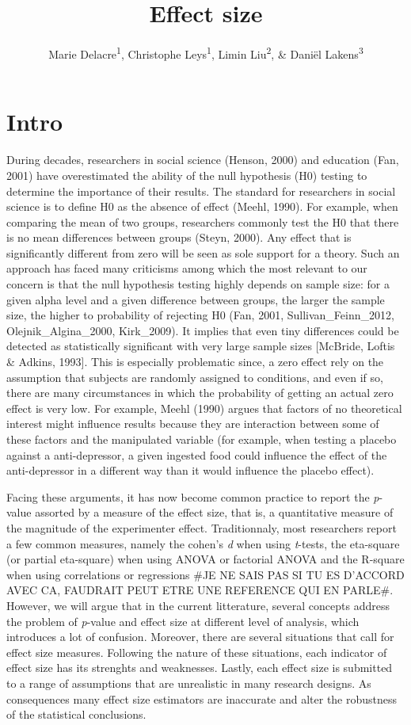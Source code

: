 \documentclass[man]{apa6}
\title{Effect size}
\author{Marie Delacre\textsuperscript{1}, Christophe Leys\textsuperscript{1}, Limin Liu\textsuperscript{2}, \& Daniël Lakens\textsuperscript{3}}
\date{}
\affiliation{
\vspace{0.5cm}
\textsuperscript{1} Université Libre de Bruxelles, Service of Analysis of the Data (SAD), Bruxelles, Belgium\\\textsuperscript{2} Université de Gant\\\textsuperscript{3} Eindhoven University of Technology, Human Technology Interaction Group, Eindhoven, the Netherlands }
\begin{document}
\maketitle

\hypertarget{intro}{%
\section{Intro}\label{intro}}

During decades, researchers in social science (Henson, 2000) and education (Fan, 2001) have overestimated the ability of the null hypothesis (H0) testing to determine the importance of their results. The standard for researchers in social science is to define H0 as the absence of effect (Meehl, 1990). For example, when comparing the mean of two groups, researchers commonly test the H0 that there is no mean differences between groups (Steyn, 2000). Any effect that is significantly different from zero will be seen as sole support for a theory. Such an approach has faced many criticisms among which the most relevant to our concern is that the null hypothesis testing highly depends on sample size: for a given alpha level and a given difference between groups, the larger the sample size, the higher to probability of rejecting H0 (Fan, 2001, Sullivan\_Feinn\_2012, Olejnik\_Algina\_2000, Kirk\_2009). It implies that even tiny differences could be detected as statistically significant with very large sample sizes {[}McBride, Loftis \& Adkins, 1993{]}. This is especially problematic since, a zero effect rely on the assumption that subjects are randomly assigned to conditions, and even if so, there are many circumstances in which the probability of getting an actual zero effect is very low. For example, Meehl (1990) argues that factors of no theoretical interest might influence results because they are interaction between some of these factors and the manipulated variable (for example, when testing a placebo against a anti-depressor, a given ingested food could influence the effect of the anti-depressor in a different way than it would influence the placebo effect).

Facing these arguments, it has now become common practice to report the \emph{p}-value assorted by a measure of the effect size, that is, a quantitative measure of the magnitude of the experimenter effect. Traditionnaly, most researchers report a few common measures, namely the cohen's \emph{d} when using \emph{t}-tests, the eta-square (or partial eta-square) when using ANOVA or factorial ANOVA and the R-square when using correlations or regressions \#JE NE SAIS PAS SI TU ES D'ACCORD AVEC CA, FAUDRAIT PEUT ETRE UNE REFERENCE QUI EN PARLE\#. However, we will argue that in the current litterature, several concepts address the problem of \emph{p}-value and effect size at different level of analysis, which introduces a lot of confusion. Moreover, there are several situations that call for effect size measures. Following the nature of these situations, each indicator of effect size has its strenghts and weaknesses. Lastly, each effect size is submitted to a range of assumptions that are unrealistic in many research designs. As consequences many effect size estimators are inaccurate and alter the robustness of the statistical conclusions.
\end{document}
